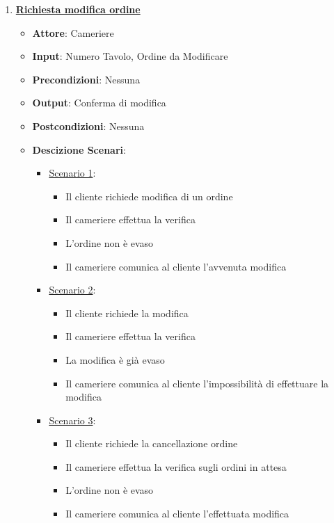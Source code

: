 \begin{enumerate}
    \item \uline {{\bf Richiesta modifica ordine}}
    \begin{itemize}
        \item {\bf Attore}: Cameriere
        \item {\bf Input}: Numero Tavolo, Ordine da Modificare
        \item {\bf Precondizioni}: Nessuna
        \item {\bf Output}: Conferma di modifica
        \item {\bf Postcondizioni}: Nessuna
        \item {\bf Descizione Scenari}:
        \begin{itemize}
            \item \uline{Scenario 1}:
            \begin{itemize}
                \item Il cliente richiede modifica di un ordine
                \item Il cameriere effettua la verifica
                \item L'ordine non \`e evaso
                \item Il cameriere comunica al cliente l'avvenuta modifica 
            \end{itemize}
            \item \uline{Scenario 2}:
            \begin{itemize}
                \item Il cliente richiede la modifica
                \item Il cameriere effettua la verifica
                \item La modifica \`e gi\`a evaso
                \item Il cameriere comunica al cliente l'impossibilit\`a di effettuare la modifica
            \end{itemize}
            \item \uline{Scenario 3}:
            \begin{itemize}
                \item Il cliente richiede la cancellazione ordine
                \item Il cameriere effettua la verifica sugli ordini in attesa
                \item L'ordine non \`e evaso
                \item Il cameriere comunica al cliente l'effettuata modifica
            \end{itemize}

\end{itemize}
\end{itemize}
\end{enumerate}
